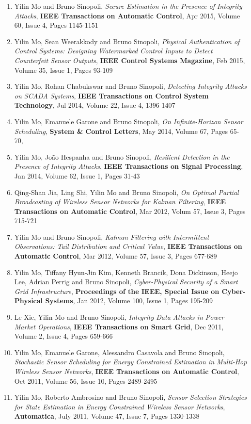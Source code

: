 \documentclass[10pt, a4paper]{article}
\begin{document}
\begin{enumerate}
\item Yilin Mo and Bruno Sinopoli, \emph{{Secure Estimation in the Presence of Integrity Attacks}}, \textbf{IEEE Transactions on Automatic Control}, Apr 2015, Volume 60, Issue 4, Pages 1145-1151
\item Yilin Mo, Sean Weerakkody and Bruno Sinopoli, \emph{{Physical Authentication of Control Systems: Designing Watermarked Control Inputs to Detect Counterfeit Sensor Outputs}}, \textbf{IEEE Control Systems Magazine}, Feb 2015, Volume 35, Issue 1, Pages 93-109
\item Yilin Mo, Rohan Chabukswar and Bruno Sinopoli, \emph{{Detecting Integrity Attacks on SCADA Systems}}, \textbf{IEEE Transactions on Control System Technology}, Jul 2014, Volume 22, Issue 4, 1396-1407
\item Yilin Mo, Emanuele Garone and Bruno Sinopoli, \emph{{On Infinite-Horizon Sensor Scheduling}}, \textbf{System \& Control Letters}, May 2014, Volume 67, Pages 65-70,
\item Yilin Mo, Jo\~{a}o Hespanha and Bruno Sinopoli, \emph{{Resilient Detection in the Presence of Integrity Attacks}}, \textbf{IEEE Transactions on Signal Processing}, Jan 2014, Volume 62, Issue 1, Pages 31-43
\item Qing-Shan Jia, Ling Shi, Yilin Mo and Bruno Sinopoli, \emph{{On Optimal Partial Broadcasting of Wireless Sensor Networks for Kalman Filtering}}, \textbf{IEEE Transactions on Automatic Control}, Mar 2012, Volum 57, Issue 3, Pages 715-721
\item Yilin Mo and Bruno Sinopoli, \emph{{Kalman Filtering with Intermittent Observations: Tail Distribution and Critical Value}}, \textbf{IEEE Transactions on Automatic Control}, Mar 2012, Volume 57, Issue 3, Pages 677-689
\item Yilin Mo, Tiffany Hyun-Jin Kim, Kenneth Brancik, Dona Dickinson, Heejo Lee, Adrian Perrig and Bruno Sinopoli, \emph{{Cyber-Physical Security of a Smart Grid Infrastructure}}, \textbf{Proceedings of the IEEE, Special Issue on Cyber-Physical Systems}, Jan 2012, Volume 100, Issue 1, Pages 195-209
\item Le Xie, Yilin Mo and Bruno Sinopoli, \emph{{Integrity Data Attacks in Power Market Operations}}, \textbf{IEEE Transactions on Smart Grid}, Dec 2011, Volume 2, Issue 4, Pages 659-666
\item Yilin Mo, Emanuele Garone, Alessandro Casavola and Bruno Sinopoli, \emph{{Stochastic Sensor Scheduling for Energy Constrained Estimation in Multi-Hop Wireless Sensor Networks}}, \textbf{IEEE Transactions on Automatic Control}, Oct 2011, Volume 56, Issue 10, Pages 2489-2495
\item Yilin Mo, Roberto Ambrosino and Bruno Sinopoli, \emph{{Sensor Selection Strategies for State Estimation in Energy Constrained Wireless Sensor Networks}}, \textbf{Automatica}, July 2011, Volume 47, Issue 7, Pages 1330-1338
\end{enumerate}
\end{document}
